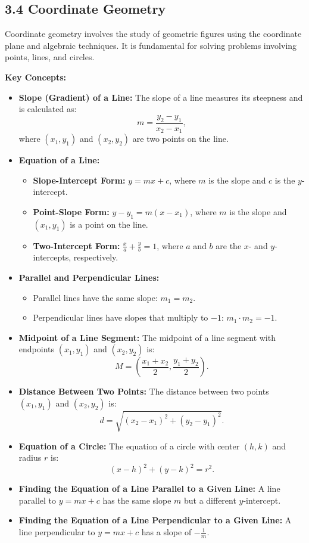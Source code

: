 
\subsection*{3.4 Coordinate Geometry}
Coordinate geometry involves the study of geometric figures using the coordinate plane and algebraic techniques. It is fundamental for solving problems involving points, lines, and circles.

\textbf{Key Concepts:}
\begin{itemize}
	\item \textbf{Slope (Gradient) of a Line:} The slope of a line measures its steepness and is calculated as:
	\[
	m = \frac{y_2 - y_1}{x_2 - x_1},
	\]
	where $(x_1, y_1)$ and $(x_2, y_2)$ are two points on the line.
	\item \textbf{Equation of a Line:}
	\begin{itemize}
		\item \textbf{Slope-Intercept Form:} $y = mx + c$, where $m$ is the slope and $c$ is the $y$-intercept.
		\item \textbf{Point-Slope Form:} $y - y_1 = m(x - x_1)$, where $m$ is the slope and $(x_1, y_1)$ is a point on the line.
		\item \textbf{Two-Intercept Form:} $\frac{x}{a} + \frac{y}{b} = 1$, where $a$ and $b$ are the $x$- and $y$-intercepts, respectively.
	\end{itemize}
	\item \textbf{Parallel and Perpendicular Lines:}
	\begin{itemize}
		\item Parallel lines have the same slope: $m_1 = m_2$.
		\item Perpendicular lines have slopes that multiply to $-1$: $m_1 \cdot m_2 = -1$.
	\end{itemize}
	\item \textbf{Midpoint of a Line Segment:} The midpoint of a line segment with endpoints $(x_1, y_1)$ and $(x_2, y_2)$ is:
	\[
	M = \left( \frac{x_1 + x_2}{2}, \frac{y_1 + y_2}{2} \right).
	\]
	\item \textbf{Distance Between Two Points:} The distance between two points $(x_1, y_1)$ and $(x_2, y_2)$ is:
	\[
	d = \sqrt{(x_2 - x_1)^2 + (y_2 - y_1)^2}.
	\]
	\item \textbf{Equation of a Circle:} The equation of a circle with center $(h, k)$ and radius $r$ is:
	\[
	(x - h)^2 + (y - k)^2 = r^2.
	\]
	\item \textbf{Finding the Equation of a Line Parallel to a Given Line:} A line parallel to $y = mx + c$ has the same slope $m$ but a different $y$-intercept.
	\item \textbf{Finding the Equation of a Line Perpendicular to a Given Line:} A line perpendicular to $y = mx + c$ has a slope of $-\frac{1}{m}$.
\end{itemize}

